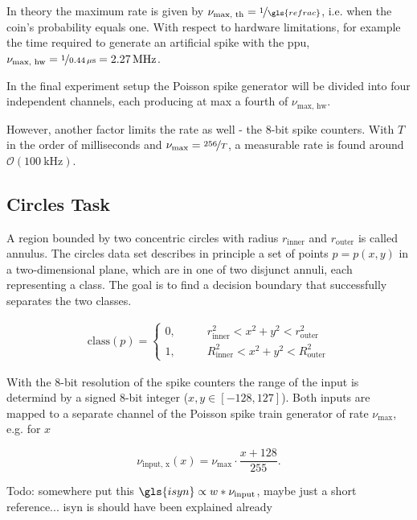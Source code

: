 In theory the maximum rate is given by $\nu_\text{max, th} = \nicefrac{1}{\gls{refrac}}$, i.e. when the coin's probability equals one. With respect to hardware limitations, for example the time required to generate an artificial spike with the \gls{ppu}, $\nu_\text{max, hw} = \nicefrac{1}{\SI{0.44}{\mu \s}} = \SI{2.27}{\mega \Hz}$.

In the final experiment setup the Poisson spike generator will be divided into four independent channels, each producing at max a fourth of $\nu_\text{max, hw}$.

However, another factor limits the rate as well - the 8-bit spike counters. With $T$ in the order of milliseconds and $\nu_\text{max} = \nicefrac{256}{T}$, a measurable rate is found around $\mathcal{O}(\SI{100}{\kilo \Hz})$.

\subsection{Circles Task}
A region bounded by two concentric circles with radius $r_{\text{inner}}$ and $r_{\text{outer}}$ is called annulus. The circles data set describes in principle a set of points $p = p(x,y)$ in a two-dimensional plane, which are in one of two disjunct annuli, each representing a class. The goal is to find a decision boundary that successfully separates the two classes.

\begin{align}
\text{class}(p) =
\begin{cases}
0 ,&\quad \quad r_{\text{inner}}^2 < x^2 + y^2 < r_{\text{outer}}^2 \\
1 ,&\quad \quad R_{\text{inner}}^2 < x^2 + y^2 < R_{\text{outer}}^2
\end{cases}
\end{align}

With the 8-bit resolution of the spike counters the range of the input is determind by a signed 8-bit integer ($x, y \in [-128,127]$). Both inputs are mapped to a separate channel of the Poisson spike train generator of rate $\nu_\text{max}$, e.g. for $x$

\begin{equation}\label{inputfrequency}
\nu_{\text{input, x}}(x) = \nu_\text{max} \cdot \frac{x + 128}{255}.
\end{equation}


Todo: somewhere put this $\gls{isyn} \propto w*\nu_{\text{input}}$, maybe just a short reference... \gls{isyn} is should have been explained already

